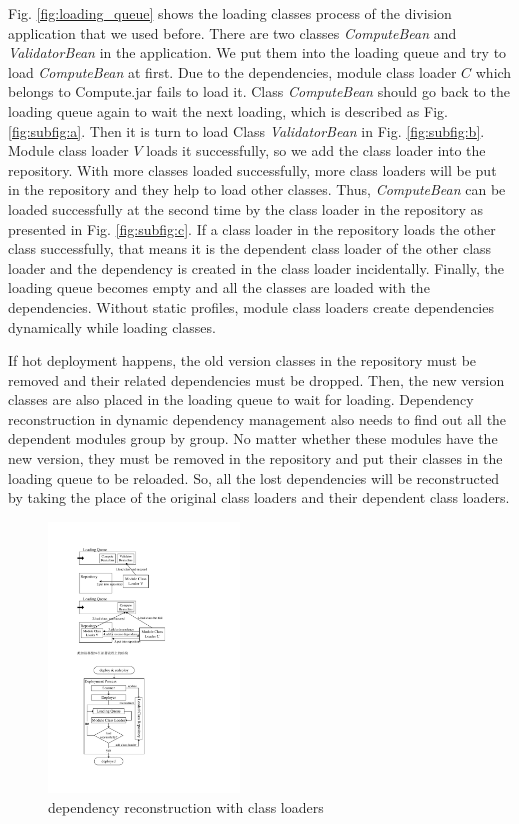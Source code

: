 \documentclass[conference]{IEEEtran}
\begin{document}
Fig. \ref{fig:loading_queue} shows the loading classes process of the division application that we used before. 
There are two classes \emph{ComputeBean} and \emph{ValidatorBean} in the application. 
We put them into the loading queue and try to load \emph{ComputeBean} at first. 
Due to the dependencies, module class loader $C$ which belongs to Compute.jar fails to load it. 
Class \emph{ComputeBean} should go back to the loading queue again to wait the next loading, which is described as Fig. \ref{fig:subfig:a}. 
Then it is turn to load Class \emph{ValidatorBean} in Fig. \ref{fig:subfig:b}. 
Module class loader $V$ loads it successfully, so we add the class loader into the repository. 
With more classes loaded successfully, more class loaders will be put in the repository and they help to load other classes. 
Thus, \emph{ComputeBean} can be loaded successfully at the second time by the class loader in the repository as presented in Fig. \ref{fig:subfig:c}.
If a class loader in the repository loads the other class successfully, that means it is the dependent class loader of the other class loader and the dependency is created in the class loader incidentally. 
Finally, the loading queue becomes empty and all the classes are loaded with the dependencies.
Without static profiles, module class loaders create dependencies dynamically while loading classes.

If hot deployment happens, the old version classes in the repository must be removed and their related dependencies must be dropped. 
Then, the new version classes are also placed in the loading queue to wait for loading. 
Dependency reconstruction in dynamic dependency management also needs to find out all the dependent modules group by group. 
No matter whether these modules have the new version, they must be removed in the repository and put their classes in the loading queue to be reloaded. 
So, all the lost dependencies will be reconstructed by taking the place of the original class loaders and their dependent class loaders. 

\begin{figure}[ht]
\centering
\includegraphics[width=2.0in]{ProcessReconstructionCL.pdf}
\caption{dependency reconstruction with class loaders}
\label{fig:reconstruction_CL}
\end{figure}
\end{document}
